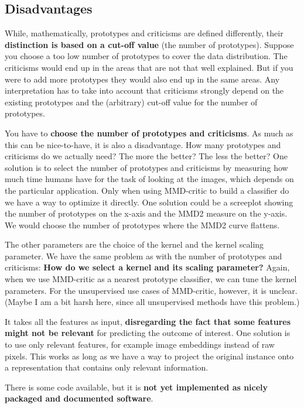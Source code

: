 \documentclass[12pt,]{krantz}
\begin{document}
\subsection{Disadvantages}\label{disadvantages-11}

While, mathematically, prototypes and criticisms are defined
differently, their \textbf{distinction is based on a cut-off value} (the
number of prototypes). Suppose you choose a too low number of prototypes
to cover the data distribution. The criticisms would end up in the areas
that are not that well explained. But if you were to add more prototypes
they would also end up in the same areas. Any interpretation has to take
into account that criticisms strongly depend on the existing prototypes
and the (arbitrary) cut-off value for the number of prototypes.

You have to \textbf{choose the number of prototypes and criticisms}. As
much as this can be nice-to-have, it is also a disadvantage. How many
prototypes and criticisms do we actually need? The more the better? The
less the better? One solution is to select the number of prototypes and
criticisms by measuring how much time humans have for the task of
looking at the images, which depends on the particular application. Only
when using MMD-critic to build a classifier do we have a way to optimize
it directly. One solution could be a screeplot showing the number of
prototypes on the x-axis and the MMD2 measure on the y-axis. We would
choose the number of prototypes where the MMD2 curve flattens.

The other parameters are the choice of the kernel and the kernel scaling
parameter. We have the same problem as with the number of prototypes and
criticisms: \textbf{How do we select a kernel and its scaling
parameter?} Again, when we use MMD-critic as a nearest prototype
classifier, we can tune the kernel parameters. For the unsupervised use
cases of MMD-critic, however, it is unclear. (Maybe I am a bit harsh
here, since all unsupervised methods have this problem.)

It takes all the features as input, \textbf{disregarding the fact that
some features might not be relevant} for predicting the outcome of
interest. One solution is to use only relevant features, for example
image embeddings instead of raw pixels. This works as long as we have a
way to project the original instance onto a representation that contains
only relevant information.

There is some code available, but it is \textbf{not yet implemented as
nicely packaged and documented software}.
\end{document}
